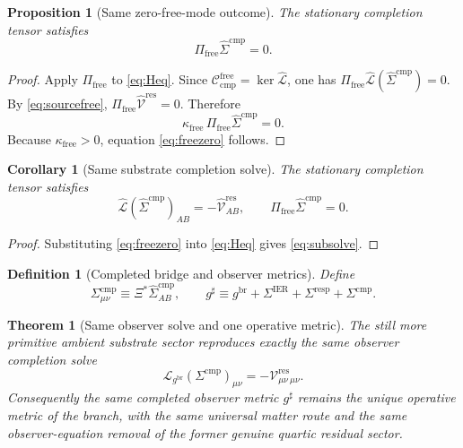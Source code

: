 \documentclass[11pt]{article}
\newcommand{\ObserverMap}{\Xi}
\newcommand{\ObserverMetric}{g^{\mathrm{br}}}
\newcommand{\CompletedMetric}{g^{\sharp}}
\newcommand{\BaseShift}{\Sigma^{\mathrm{IER}}}
\newcommand{\ResponseShift}{\Sigma^{\mathrm{resp}}}
\newcommand{\CompShift}{\Sigma^{\mathrm{cmp}}}
\newcommand{\CompLift}{\widehat\Sigma^{\mathrm{cmp}}}
\newcommand{\ResidualCore}{\mathcal V_{\mu\nu}^{\mathrm{res}}}
\newcommand{\ResidualLift}{\widehat{\mathcal V}^{\mathrm{res}}}
\newcommand{\SubReducedEin}{\widehat{\mathcal L}}
\newcommand{\FreeProj}{\Pi_{\mathrm{free}}}
\newcommand{\ReducedEin}{\mathcal L_{\ObserverMetric}}
\newcommand{\CompFree}{\mathscr C_{\mathrm{cmp}}^{\mathrm{free}}}
\newcommand{\FreeStiff}{\kappa_{\mathrm{free}}}
\newtheorem{definition}{Definition}
\newtheorem{proposition}{Proposition}
\newtheorem{corollary}{Corollary}
\newtheorem{theorem}{Theorem}
\begin{document}
\begin{proposition}[Same zero-free-mode outcome]
\label{prop:freezero}
The stationary completion tensor satisfies
\begin{equation}
\FreeProj\CompLift=0.
\label{eq:freezero}
\end{equation}
\end{proposition}

\begin{proof}
Apply \(\FreeProj\) to \eqref{eq:Heq}. Since \(\CompFree=\ker\SubReducedEin\), one has \(\FreeProj\SubReducedEin(\CompLift)=0\). By \eqref{eq:sourcefree}, \(\FreeProj\ResidualLift=0\). Therefore
\[
\FreeStiff\,\FreeProj\CompLift=0.
\]
Because \(\FreeStiff>0\), equation \eqref{eq:freezero} follows.
\end{proof}

\begin{corollary}[Same substrate completion solve]
\label{cor:subsolve}
The stationary completion tensor satisfies
\begin{equation}
\SubReducedEin(\CompLift)_{AB}
=
-\ResidualLift_{AB},
\qquad
\FreeProj\CompLift=0.
\label{eq:subsolve}
\end{equation}
\end{corollary}

\begin{proof}
Substituting \eqref{eq:freezero} into \eqref{eq:Heq} gives \eqref{eq:subsolve}.
\end{proof}

\begin{definition}[Completed bridge and observer metrics]
\label{def:completed}
Define
\begin{equation}
\CompShift_{\mu\nu}
\equiv
\ObserverMap^*\CompLift_{AB},
\qquad
\CompletedMetric
\equiv
\ObserverMetric+\BaseShift+\ResponseShift+\CompShift.
\label{eq:completedmetric}
\end{equation}
\end{definition}

\begin{theorem}[Same observer solve and one operative metric]
\label{thm:observer}
The still more primitive ambient substrate sector reproduces exactly the same observer completion solve
\begin{equation}
\ReducedEin(\CompShift)_{\mu\nu}
=
-\ResidualCore{}_{\mu\nu}.
\label{eq:observereq}
\end{equation}
Consequently the same completed observer metric \(\CompletedMetric\) remains the unique operative metric of the branch, with the same universal matter route and the same observer-equation removal of the former genuine quartic residual sector.
\end{theorem}
\end{document}
